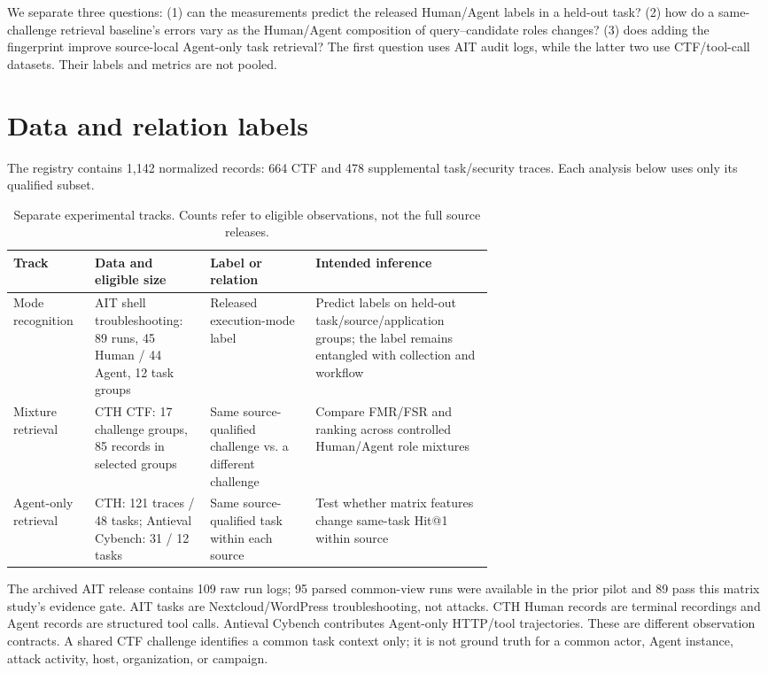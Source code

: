 \documentclass[11pt]{article}
\begin{document}
We separate three questions: (1) can the measurements predict the released Human/Agent labels in a held-out task? (2) how do a same-challenge retrieval baseline's errors vary as the Human/Agent composition of query--candidate roles changes? (3) does adding the fingerprint improve source-local Agent-only task retrieval? The first question uses AIT audit logs, while the latter two use CTF/tool-call datasets. Their labels and metrics are not pooled.

\section{Data and relation labels}
The registry contains 1,142 normalized records: 664 CTF and 478 supplemental task/security traces. Each analysis below uses only its qualified subset.

\begin{table}[ht]
\centering
\small
\caption{Separate experimental tracks. Counts refer to eligible observations, not the full source releases.}
\begin{tabularx}{\linewidth}{@{}p{0.17\linewidth}p{0.24\linewidth}p{0.22\linewidth}X@{}}
\toprule
Track & Data and eligible size & Label or relation & Intended inference \\
\midrule
Mode recognition & AIT shell troubleshooting: 89 runs, 45 Human / 44 Agent, 12 task groups & Released execution-mode label & Predict labels on held-out task/source/application groups; the label remains entangled with collection and workflow \\
Mixture retrieval & CTH CTF: 17 challenge groups, 85 records in selected groups & Same source-qualified challenge vs. a different challenge & Compare FMR/FSR and ranking across controlled Human/Agent role mixtures \\
Agent-only retrieval & CTH: 121 traces / 48 tasks; Antieval Cybench: 31 / 12 tasks & Same source-qualified task within each source & Test whether matrix features change same-task Hit@1 within source \\
\bottomrule
\end{tabularx}
\end{table}

The archived AIT release contains 109 raw run logs; 95 parsed common-view runs were available in the prior pilot and 89 pass this matrix study's evidence gate. AIT tasks are Nextcloud/WordPress troubleshooting, not attacks. CTH Human records are terminal recordings and Agent records are structured tool calls. Antieval Cybench contributes Agent-only HTTP/tool trajectories. These are different observation contracts. A shared CTF challenge identifies a common task context only; it is not ground truth for a common actor, Agent instance, attack activity, host, organization, or campaign.
\end{document}
